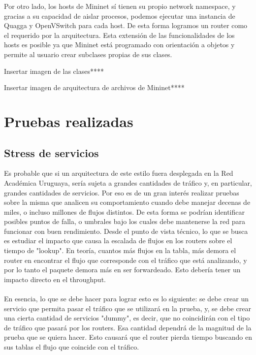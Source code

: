 \documentclass[a4paper,12pt]{report}
\begin{document}
Por otro lado, los hosts de Mininet sí tienen su propio network namespace, y gracias a su capacidad de aislar procesos, podemos ejecutar una instancia de Quagga y OpenVSwitch para cada host. De esta forma logramos un router como el requerido por la arquitectura. Esta extensión de las funcionalidades de los hosts es posible ya que Mininet está programado con orientación a objetos y permite al usuario crear subclases propias de sus clases.

Insertar imagen de las clases****

Insertar imagen de arquitectura de archivos de Mininet****



\section{Pruebas realizadas}

\subsection{Stress de servicios}
Es probable que si un arquitectura de este estilo fuera desplegada en la Red Académica Uruguaya, sería sujeta a grandes cantidades de tráfico y, en particular, grandes cantidades de servicios. Por eso es de un gran interés realizar pruebas sobre la misma que analicen su comportamiento cuando debe manejar decenas de miles, o incluso millones de flujos distintos. De esta forma se podrían identificar posibles puntos de falla, o umbrales bajo los cuales debe mantenerse la red para funcionar con buen rendimiento.
Desde el punto de vista técnico, lo que se busca es estudiar el impacto que causa la escalada de flujos en los routers sobre el tiempo de "lookup". En teoría, cuantos más flujos en la tabla, más demora el router en encontrar el flujo que corresponde con el tráfico que está analizando, y por lo tanto el paquete demora más en ser forwardeado. Esto debería tener un impacto directo en el throughput.\\
\\
En esencia, lo que se debe hacer para lograr esto es lo siguiente: se debe crear un servicio que permita pasar el tráfico que se utilizará en la prueba, y, se debe crear una cierta cantidad de servicios "dummy", es decir, que no coincidirán con el tipo de tráfico que pasará por los routers. Esa cantidad dependrá de la magnitud de la prueba que se quiera hacer. Esto causará que el router pierda tiempo buscando en sus tablas el flujo que coincide con el tráfico.\\
\end{document}
